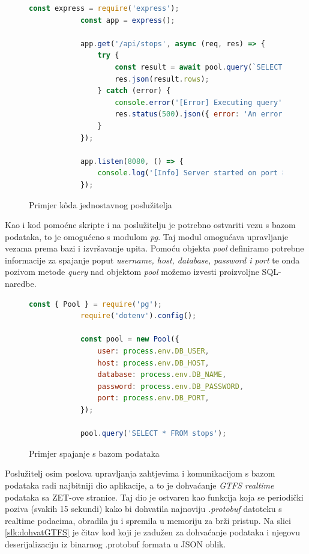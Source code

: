 \documentclass[zavrsnirad]{fer}
\begin{document}
\begin{figure}[H]
	\centering
	\begin{minipage}{0.9\linewidth}
		\begin{lstlisting}[language=JavaScript]
			const express = require('express');
			const app = express();
			
			app.get('/api/stops', async (req, res) => {
				try {
					const result = await pool.query(`SELECT DISTINCT stop_name FROM stops`);
					res.json(result.rows);
				} catch (error) {
					console.error('[Error] Executing query', error);
					res.status(500).json({ error: 'An error occurred' });
				}
			});
			
			app.listen(8080, () => {
				console.log('[Info] Server started on port 8080');
			});
		\end{lstlisting}
	\end{minipage}
	\caption{Primjer k\^oda jednostavnog poslužitelja}
	\label{slk:express}
\end{figure}
\newpage
Kao i kod pomoćne skripte i na poslužitelju je potrebno ostvariti vezu s bazom podataka, to je omogućeno s modulom \textit{pg}. Taj modul omogućava upravljanje vezama prema bazi i izvršavanje upita.
Pomoću objekta \textit{pool} definiramo potrebne informacije za spajanje poput \textit{username, host, database, password i port} te onda pozivom metode \textit{query} nad objektom \textit{pool} možemo izvesti proizvoljne SQL-naredbe.

\begin{figure}[H]
	\centering
	\begin{minipage}{0.9\linewidth}
		\begin{lstlisting}[language=JavaScript]
			const { Pool } = require('pg');
			require('dotenv').config();

			const pool = new Pool({
				user: process.env.DB_USER,
				host: process.env.DB_HOST,
				database: process.env.DB_NAME,
				password: process.env.DB_PASSWORD,
				port: process.env.DB_PORT,
			});
			
			pool.query('SELECT * FROM stops');
		\end{lstlisting}
	\end{minipage}
	\caption{Primjer spajanje s bazom podataka}
	\label{slk:baza}
\end{figure}

Poslužitelj osim poslova upravljanja zahtjevima i komunikacijom s bazom podataka radi najbitniji dio aplikacije, a to je dohvaćanje \textit{GTFS realtime} podataka sa ZET-ove stranice. Taj dio je ostvaren kao funkcija koja se periodički poziva (svakih 15 sekundi) kako bi dohvatila najnoviju \textit{.protobuf} datoteku s realtime podacima, obradila ju i spremila u memoriju za brži pristup. Na slici \ref{slk:dohvatGTFS} je čitav kod koji je zadužen za dohvaćanje podataka i njegovu deserijalizaciju iz binarnog .protobuf formata u JSON oblik.\\
\end{document}
